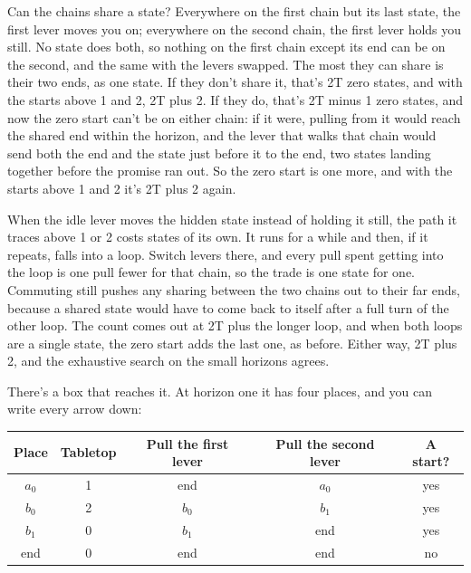 \documentclass[11pt,twoside]{article}
\theoremstyle{thielethm}
\theoremstyle{thieledef}
\theoremstyle{thieledef}
\theoremstyle{thieledef}
\theoremstyle{thielethm}
\theoremstyle{thieleobs}
\theoremstyle{thielethm}
\begin{document}
Can the chains share a state? Everywhere on the first chain but its last state, the first lever moves you on; everywhere on the second chain, the first lever holds you still. No state does both, so nothing on the first chain except its end can be on the second, and the same with the levers swapped. The most they can share is their two ends, as one state. If they don't share it, that's 2T zero states, and with the starts above 1 and 2, 2T plus 2. If they do, that's 2T minus 1 zero states, and now the zero start can't be on either chain: if it were, pulling from it would reach the shared end within the horizon, and the lever that walks that chain would send both the end and the state just before it to the end, two states landing together before the promise ran out. So the zero start is one more, and with the starts above 1 and 2 it's 2T plus 2 again.

When the idle lever moves the hidden state instead of holding it still, the path it traces above 1 or 2 costs states of its own. It runs for a while and then, if it repeats, falls into a loop. Switch levers there, and every pull spent getting into the loop is one pull fewer for that chain, so the trade is one state for one. Commuting still pushes any sharing between the two chains out to their far ends, because a shared state would have to come back to itself after a full turn of the other loop. The count comes out at 2T plus the longer loop, and when both loops are a single state, the zero start adds the last one, as before. Either way, 2T plus 2, and the exhaustive search on the small horizons agrees.

There's a box that reaches it. At horizon one it has four places, and you can write every arrow down:

\begin{center}
\small
\begin{tabular}{@{}ccccc@{}}
Place & Tabletop & Pull the first lever & Pull the second lever & A start? \\ \hline
$a_0$ & 1 & end & $a_0$ & yes \\
$b_0$ & 2 & $b_0$ & $b_1$ & yes \\
$b_1$ & 0 & $b_1$ & end & yes \\
end & 0 & end & end & no \\ \hline
\end{tabular}
\end{center}
\end{document}

